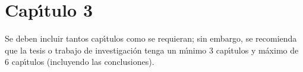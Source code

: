 \chapter{Cap\'{\i}tulo 3}
Se deben incluir tantos cap\'{\i}tulos como se requieran; sin embargo, se recomienda que la tesis  o trabajo de investigaci\'{o}n tenga un m\'{\i}nimo 3 cap\'{\i}tulos y m\'{a}ximo de 6 cap\'{\i}tulos (incluyendo las conclusiones).\\ 